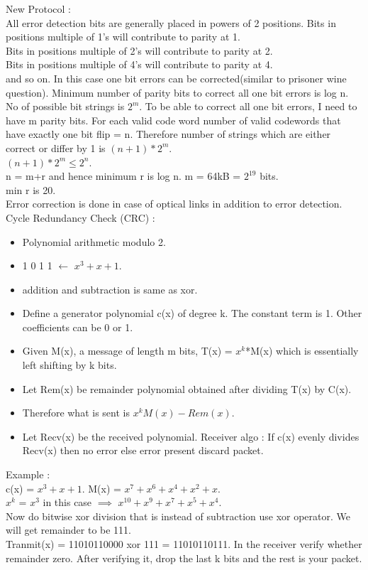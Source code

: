 \documentclass[solution,addpoints,12pt]{exam}
\begin{document}
New Protocol :\\
All error detection bits are generally placed in powers of 2 positions.
Bits in positions multiple of 1's will contribute to parity at 1.\\
Bits in positions multiple of 2's will contribute to parity at 2.\\
Bits in positions multiple of 4's will contribute to parity at 4.\\
and so on. In this case one bit errors can be corrected(similar to
prisoner wine question). Minimum number of parity bits to correct
all one bit errors is log n. No of
possible bit strings is $2^m$. To be able to correct
all one bit errors, I need to have m parity bits. For
each valid code word number of valid codewords that have
exactly one bit flip = n. Therefore number of
strings which are either correct or differ by 1 is
$(n+1)*2^m$.\\
$(n+1)*2^m \le 2^n$.\\
n = m+r and hence minimum r is log n.
m = 64kB = $2^{19}$ bits.\\
min r is 20.\\
Error correction is done in case of optical links in addition
to error detection.\\

Cycle Redundancy Check (CRC) :\\
\begin{itemize}
\item Polynomial arithmetic modulo 2.
\item 1 0 1 1 $\leftarrow$ $x^3 + x + 1$.
\item addition and subtraction is same as xor.
\item Define a generator polynomial c(x) of degree k.
The constant term is 1. Other coefficients can be 0 or 1.
\item Given M(x), a message of length m bits,
T(x) = $x^k$*M(x) which is essentially left shifting by k bits.
\item Let Rem(x) be remainder polynomial obtained
after dividing T(x) by C(x).
\item Therefore what is sent is $x^{k}M(x) - Rem(x)$.
\item Let Recv(x) be the received polynomial.
Receiver algo : If c(x) evenly divides
Recv(x) then no error else error present discard packet.
\end{itemize}

Example :\\
c(x) = $x^3+x+1$. M(x) = $x^7 + x^6 + x^4 + x^2+ x$.\\
$x^k$ = $x^3$ in this case $\implies$ $x^10 + x^9 + x^7 + x^5 + x^4$.\\
Now do bitwise xor division that is instead of
subtraction use xor operator. We will get remainder to be 111.\\
Tranmit(x) = 11010110000 xor 111 = 11010110111.
In the receiver verify whether remainder zero. After
verifying it, drop the last k bits and the rest is your
packet.\\
\end{document}
